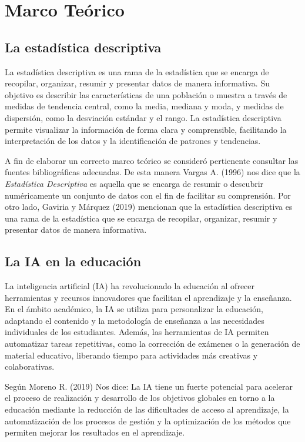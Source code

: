 \documentclass{article}
\newenvironment{marcoTeorico}{}{}
\begin{document}
\begin{marcoTeorico}
  \section{Marco Teórico}

  \subsection{La estadística descriptiva}

  La estadística descriptiva es una rama de la estadística que se encarga de recopilar, organizar, resumir y presentar datos de manera informativa. Su objetivo es describir las características de una población o muestra a través de medidas de tendencia central, como la media, mediana y moda, y medidas de dispersión, como la desviación estándar y el rango. La estadística descriptiva permite visualizar la información de forma clara y comprensible, facilitando la interpretación de los datos y la identificación de patrones y tendencias.

  A fin de elaborar un correcto marco teórico se consideró pertienente consultar las fuentes bibliográficas adecuadas. De esta manera Vargas A. (1996) nos dice que la \textit{Estadística Descriptiva} es aquella que se encarga de resumir o descubrir numéricamente un conjunto de datos con el fin de facilitar su comprensión. Por otro lado, Gaviria y Márquez (2019) mencionan que la estadística descriptiva es una rama de la estadística que se encarga de recopilar, organizar, resumir y presentar datos de manera informativa.

  \subsection{La IA en la educación}

  La inteligencia artificial (IA) ha revolucionado la educación al ofrecer herramientas y recursos innovadores que facilitan el aprendizaje y la enseñanza. En el ámbito académico, la IA se utiliza para personalizar la educación, adaptando el contenido y la metodología de enseñanza a las necesidades individuales de los estudiantes. Además, las herramientas de IA permiten automatizar tareas repetitivas, como la corrección de exámenes o la generación de material educativo, liberando tiempo para actividades más creativas y colaborativas.

  Según Moreno R. (2019) Nos dice: La IA tiene un fuerte potencial para acelerar el proceso de realización y desarrollo de los objetivos globales en torno a la educación mediante la reducción de las dificultades de acceso al aprendizaje, la automatización de los procesos de gestión y la optimización de los métodos que permiten mejorar los resultados en el aprendizaje.


\end{marcoTeorico}
\end{document}

